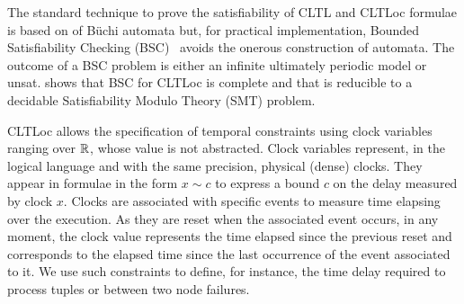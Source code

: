 The standard technique to prove the satisfiability of CLTL and CLTLoc formulae is based on of B\"uchi automata \cite{DD07,BRS15} %
but, for practical implementation, Bounded Satisfiability Checking (BSC)~\cite{MPS13} avoids the onerous construction of automata.
The outcome of a BSC problem is either an infinite ultimately periodic model or unsat.
\cite{BRS15} shows that BSC for CLTLoc is complete and that is reducible to a decidable Satisfiability Modulo Theory (SMT) problem. 

CLTLoc allows the specification of temporal constraints using clock variables ranging over $\mathbb{R}$, whose value is not abstracted.
Clock variables represent, in the logical language and with the same precision, physical (dense) clocks.
They appear in formulae in the form $x \sim c$ to express a bound $c$ on the delay measured by clock $x$. 
Clocks are associated with specific events to measure time elapsing over the execution.
As they are reset when the associated event occurs, in any moment, the clock value represents the time elapsed since the previous reset and corresponds to the elapsed time since the last occurrence of the event associated to it.
We use such constraints to define, for instance, the time delay required to process tuples or between two node failures.


